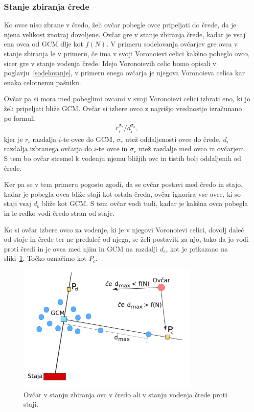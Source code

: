 \subsubsection{Stanje zbiranja črede}\label{zbiranje}

Ko ovce niso zbrane v čredo, želi ovčar pobegle ovce pripeljati do črede, da je njena velikost znotraj dovoljene. Ovčar gre v stanje zbiranja črede, kadar je vsaj ena ovca od GCM dlje kot $f(N)$. V primeru sodelovanja ovčarjev gre ovca v stanje zbiranja le v primeru, če ima v svoji Voronoievi celici kakšno pobeglo ovco, sicer gre v stanje vodenja črede. Idejo Voronoievih celic bomo opisali v poglavju~\ref{sodelovanje}, v primeru enega ovčarja je njegova Voronoieva celica kar enaka celotnemu pašniku.

Ovčar pa si mora med pobeglimi ovcami v svoji Voronoievi celici izbrati eno, ki jo želi pripeljati bliže GCM. Ovčar si izbere ovco z najvišjo vrednostjo izračunano po formuli
\begin{align}
r_i^{\sigma_r} / d_i^{\sigma_d}, \label{eq:zbiranje}
\end{align}
kjer je $r_i$ razdalja $i$-te ovce do GCM, $\sigma_r$ utež oddaljenosti ovce do črede, $d_{i}$ razdalja izbranega ovčarja do $i$-te ovce in $\sigma_r$ utež razdalje med ovco in ovčarjem. S tem bo ovčar stremel k vodenju njemu bližjih ovc in tistih bolj oddaljenih od črede.

Ker pa se v tem primeru pogosto zgodi, da se ovčar postavi med čredo in stajo, kadar je pobegla ovca bliže staji kot ostala čreda, ovčar ignorira vse ovce, ki so staji vsaj $d_b$ bliže kot GCM. S tem ovčar vodi tudi, kadar je kakšna ovca pobegla in le redko vodi čredo stran od staje.

Ko si ovčar izbere ovco za vodenje, ki je v njegovi Voronoievi celici, dovolj daleč od staje in črede ter ne predaleč od njega, se želi postaviti za njo, tako da jo vodi proti čredi in je ovca med njim in GCM na razdalji $d_c$, kot je prikazano na sliki~\ref{fig:zbiranje}. Točko označimo kot $P_c$.

\begin{figure}[ht]  %
	\centering
	\includegraphics[width=0.8\textwidth]{../poglavja/images/zbiranje.pdf}
	\caption[Stanje zbiranja in vodenja črede]{Ovčar v stanju zbiranja ovc v čredo ali v stanju vodenja črede proti staji.} %
	\label{fig:zbiranje}
\end{figure}


